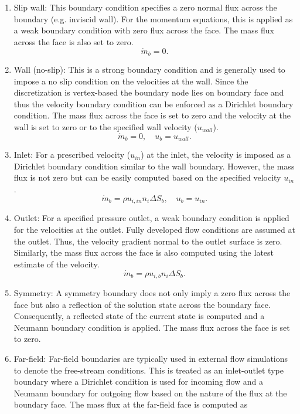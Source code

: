 \begin{enumerate}
    \item Slip wall: This boundary condition specifies a zero normal flux across the boundary (e.g. inviscid wall). For the momentum equations, this is applied as a weak boundary condition with zero flux across the face. The mass flux across the face is also set to zero.
\begin{equation}
\dot{m}_b = 0.
\end{equation}
    \item Wall (no-slip): This is a strong boundary condition and is generally used to impose a no slip condition on the velocities at the wall. Since the discretization is vertex-based the boundary node lies on boundary face and thus the velocity boundary condition can be enforced as a Dirichlet boundary condition. The mass flux across the face is set to zero and the velocity at the wall is set to zero or to the specified wall velocity ($u_{wall}$).
\begin{equation}
\dot{m}_b = 0, \quad u_b = u_{wall}.
\end{equation}
    \item Inlet: For a prescribed velocity ($u_{in}$) at the inlet, the velocity is imposed as a Dirichlet boundary condition similar to the wall boundary. However, the mass flux is not zero but can be easily computed based on the specified velocity $u_{in}$.
\begin{equation}
\dot{m}_b = \rho u_{i,in} n_i \Delta S_{b}, \quad u_b = u_{in}.
\end{equation}
    \item Outlet: For a specified pressure outlet, a weak boundary condition is applied for the velocities at the outlet. Fully developed flow conditions are assumed at the outlet. Thus, the velocity gradient normal to the outlet surface is zero. Similarly, the mass flux across the face is also computed using the latest estimate of the velocity.
    \begin{equation}
\dot{m}_b = \rho u_{i,b}n_i\Delta S_{b}.
\end{equation}
    \item Symmetry: A symmetry boundary does not only imply a zero flux across the face but also a reflection of the solution state across the boundary face. Consequently, a reflected state of the current state is computed and a Neumann boundary condition is applied. The mass flux across the face is set to zero.
    \item Far-field: Far-field boundaries are typically used in external flow simulations to denote the free-stream conditions. This is treated as an inlet-outlet type boundary where a Dirichlet condition is used for incoming flow and a Neumann boundary for outgoing flow based on the nature of the flux at the boundary face. The mass flux at the far-field face is computed as 

\end{enumerate}
